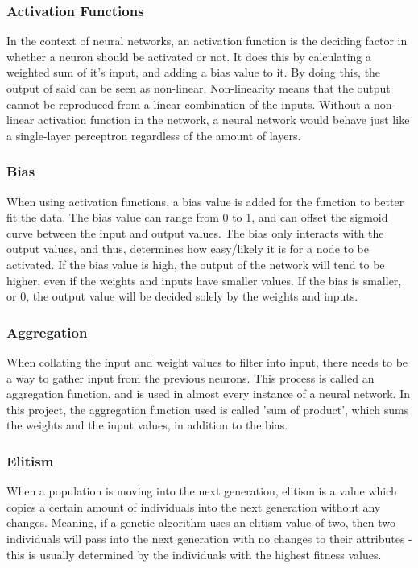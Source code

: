 \documentclass[12pt,a4paper]{article}
\begin{document}
\subsubsection{Activation Functions}
In the context of neural networks, an activation function is the deciding factor in whether a neuron should be activated or not. It does this by calculating a weighted sum of it's input, and adding a bias value to it. By doing this, the output of said can be seen as non-linear. Non-linearity means that the output cannot be reproduced from a linear combination of the inputs. Without a non-linear activation function in the network, a neural network would behave just like a single-layer perceptron regardless of the amount of layers.

\subsubsection{Bias}
When using activation functions, a bias value is added for the function to better fit the data. The bias value can range from 0 to 1, and can offset the sigmoid curve between the input and output values. The bias only interacts with the output values, and thus, determines how easy/likely it is for a node to be activated. If the bias value is high, the output of the network will tend to be higher, even if the weights and inputs have smaller values. If the bias is smaller, or 0, the output value will be decided solely by the weights and inputs.

\subsubsection{Aggregation}
When collating the input and weight values to filter into input, there needs to be a way to gather input from the previous neurons. This process is called an aggregation function, and is used in almost every instance of a neural network. In this project, the aggregation function used is called 'sum of product', which sums the weights and the input values, in addition to the bias.

\subsubsection{Elitism}
When a population is moving into the next generation, elitism is a value which copies a certain amount of individuals into the next generation without any changes. Meaning, if a genetic algorithm uses an elitism value of two, then two individuals will pass into the next generation with no changes to their attributes - this is usually determined by the individuals with the highest fitness values.
\end{document}

